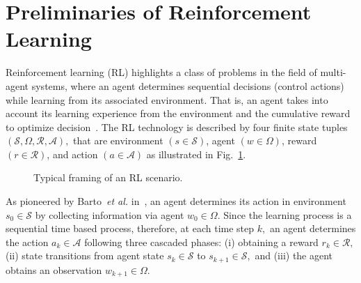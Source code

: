 \documentclass[letterpaper]{article} %
\begin{document}


\section{Preliminaries of Reinforcement Learning}
\label{sec:reinf-learn}

Reinforcement learning (RL) highlights a class of problems in the  field of multi-agent systems, where an agent determines sequential decisions (control actions) while learning from its associated environment. That is, an agent takes into account its learning  experience from the environment  and the cumulative reward to optimize decision~\cite{Francois-Lavet:2018}. The RL technology is described by four finite state tuples~$(\mathcal{S},\Omega,\mathcal{R},\mathcal{A}),$ that are  environment $(s \in \mathcal{S})$, agent $(w \in \Omega)$, reward $(r \in \mathcal{R})$, and action $(a \in \mathcal{A})$ as illustrated in Fig.~\ref{fig:fig-rl}. %
%
\begin{figure}
  \centering
  \caption{Typical framing of an RL scenario.}
  \label{fig:fig-rl}
\end{figure}
%
As pioneered by Barto~\textit{et al.} in~\cite{Barto1983-Neuronlike}, an agent determines its action in environment $s_0 \in \mathcal{S}$ by collecting information via agent $w_0 \in \Omega.$ Since the learning process is a sequential time based process, therefore, at each time step $k,$ an  agent determines  the action $a_k \in \mathcal{A}$ following three cascaded phases: (i) obtaining a reward $r_k \in \mathcal{R},$ %
%
(ii) state transitions from agent state $s_k \in \mathcal{S}$ to $s_{k+1} \in \mathcal{S},$ %
and (iii) the agent obtains an observation $w_{k+1} \in \Omega.$ %
\end{document}
